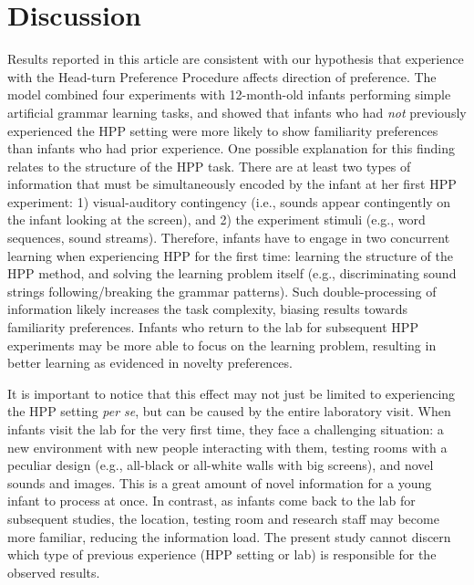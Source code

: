 \documentclass[english,man,man,floatsintext]{apa6}
\begin{document}
\hypertarget{discussion}{%
\section{Discussion}\label{discussion}}

Results reported in this article are consistent with our hypothesis that experience with the Head-turn Preference Procedure affects direction of preference. The model combined four experiments with 12-month-old infants performing simple artificial grammar learning tasks, and showed that infants who had \emph{not} previously experienced the HPP setting were more likely to show familiarity preferences than infants who had prior experience. One possible explanation for this finding relates to the structure of the HPP task. There are at least two types of information that must be simultaneously encoded by the infant at her first HPP experiment: 1) visual-auditory contingency (i.e., sounds appear contingently on the infant looking at the screen), and 2) the experiment stimuli (e.g., word sequences, sound streams). Therefore, infants have to engage in two concurrent learning when experiencing HPP for the first time: learning the structure of the HPP method, and solving the learning problem itself (e.g., discriminating sound strings following/breaking the grammar patterns). Such double-processing of information likely increases the task complexity, biasing results towards familiarity preferences. Infants who return to the lab for subsequent HPP experiments may be more able to focus on the learning problem, resulting in better learning as evidenced in novelty preferences.

It is important to notice that this effect may not just be limited to experiencing the HPP setting \emph{per se}, but can be caused by the entire laboratory visit. When infants visit the lab for the very first time, they face a challenging situation: a new environment with new people interacting with them, testing rooms with a peculiar design (e.g., all-black or all-white walls with big screens), and novel sounds and images. This is a great amount of novel information for a young infant to process at once. In contrast, as infants come back to the lab for subsequent studies, the location, testing room and research staff may become more familiar, reducing the information load. The present study cannot discern which type of previous experience (HPP setting or lab) is responsible for the observed results.
\end{document}

